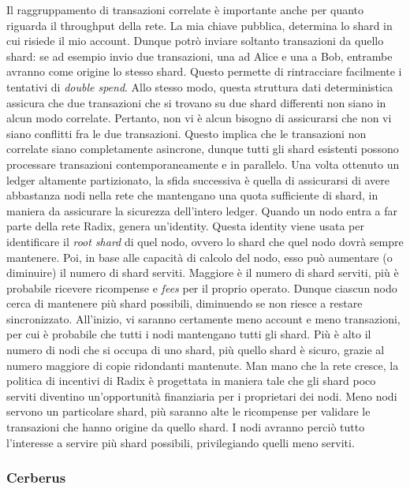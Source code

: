Il raggruppamento di transazioni correlate è importante anche per quanto riguarda il throughput della rete. La mia chiave pubblica, determina lo shard in cui risiede il mio account. Dunque potrò inviare soltanto transazioni da quello shard: se ad esempio invio due transazioni, una ad Alice e una a Bob, entrambe avranno come origine lo stesso shard. Questo permette di rintracciare facilmente i tentativi di \textit{double spend}. 
Allo stesso modo, questa struttura dati deterministica assicura che due transazioni che si trovano su due shard differenti non siano in alcun modo correlate. Pertanto, non vi è alcun bisogno di assicurarsi che non vi siano conflitti fra le due transazioni. Questo implica che le transazioni non correlate siano completamente asincrone, dunque tutti gli shard esistenti possono processare transazioni contemporaneamente e in parallelo.
Una volta ottenuto un ledger altamente partizionato, la sfida successiva è quella di assicurarsi di avere abbastanza nodi nella rete che mantengano una quota sufficiente di shard, in maniera da assicurare la sicurezza dell'intero ledger. Quando un nodo entra a far parte della rete Radix, genera un'identity. Questa identity viene usata per identificare il \textit{root shard} di quel nodo, ovvero lo shard che quel nodo dovrà sempre mantenere. Poi, in base alle capacità di calcolo del nodo, esso può aumentare (o diminuire) il numero di shard serviti. Maggiore è il numero di shard serviti, più è probabile ricevere ricompense e \textit{fees} per il proprio operato. Dunque ciascun nodo cerca di mantenere più shard possibili, diminuendo se non riesce a restare sincronizzato. All'inizio, vi saranno certamente meno account e meno transazioni, per cui è probabile che tutti i nodi mantengano tutti gli shard. Più è alto il numero di nodi che si occupa di uno shard, più quello shard è sicuro, grazie al numero maggiore di copie ridondanti mantenute. Man mano che la rete cresce, la politica di incentivi di Radix è progettata in maniera tale che gli shard poco serviti diventino un'opportunità finanziaria per i proprietari dei nodi. Meno nodi servono un particolare shard, più saranno alte le ricompense per validare le transazioni che hanno origine da quello shard. I nodi avranno perciò tutto l'interesse a servire più shard possibili, privilegiando quelli meno serviti.


\subsubsection{Cerberus}

